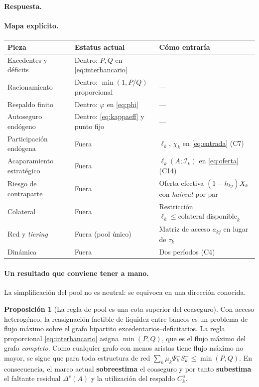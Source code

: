 \documentclass[11pt]{article}
\newcommand{\resp}{\par\noindent\textbf{Respuesta.}\par}
\theoremstyle{definition}
\newtheorem{prop}{Proposici\'on}
\begin{document}
\resp

\paragraph{Mapa expl\'icito.}
\begin{center}
\begin{tabular}{@{}p{4.3cm}p{4.6cm}p{5.6cm}@{}}
\toprule
\textbf{Pieza} & \textbf{Estatus actual} & \textbf{C\'omo entrar\'ia} \\
\midrule
Excedentes y d\'eficits & Dentro: $P,Q$ en \eqref{eq:interbancario} & --- \\
Racionamiento & Dentro: $\min(1,P/Q)$ proporcional & --- \\
Respaldo finito & Dentro: $\varphi$ en \eqref{eq:phi} & --- \\
Autoseguro end\'ogeno & Dentro: \eqref{eq:kappaeff} y punto fijo & --- \\
Participaci\'on end\'ogena & Fuera & $\ell_k$, $\chi_k$ en \eqref{eq:entrada} (C7) \\
Acaparamiento estrat\'egico & Fuera & $\ell_k(A;\mathcal{I}_k)$ en \eqref{eq:oferta} (C14) \\
Riesgo de contraparte & Fuera & Oferta efectiva $(1-h_{kj})X_k$ con \emph{haircut} por par \\
Colateral & Fuera & Restricci\'on $\ell_k\le \text{colateral disponible}_k$ \\
Red y \emph{tiering} & Fuera (pool \'unico) & Matriz de acceso $a_{kj}$ en lugar de $\tau_k$ \\
Din\'amica & Fuera & Dos per\'iodos (C4) \\
\bottomrule
\end{tabular}
\end{center}

\paragraph{Un resultado que conviene tener a mano.} La simplificaci\'on del pool
no es neutral: se equivoca en una direcci\'on conocida.

\begin{prop}[La regla de pool es una cota superior del coaseguro]
Con acceso heterog\'eneo, la reasignaci\'on factible de liquidez entre bancos es un
problema de flujo m\'aximo sobre el grafo bipartito excedentarios--deficitarios.
La regla proporcional \eqref{eq:interbancario} asigna $\min(P,Q)$, que es el flujo
m\'aximo del grafo \emph{completo}. Como cualquier grafo con menos aristas tiene
flujo m\'aximo no mayor, se sigue que para toda estructura de red
$\sum_k\mu_k\Psi^-_k S^-_k\le\min(P,Q)$. En consecuencia, el marco actual
\textbf{sobreestima} el coaseguro y por tanto \textbf{subestima} el faltante
residual $\Delta^c(A)$ y la utilizaci\'on del respaldo $C^u_k$.
\end{prop}
\end{document}

